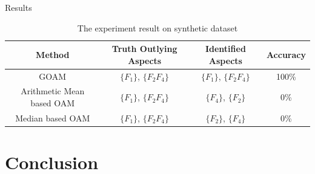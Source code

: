 \documentclass[
 size=14pt,
 paper=smartboard,  %
 mode=present, 		%
 display=slides, 	%
 style=tuliplab,  	%
 pauseslide,
 fleqn,leqno]{powerdot}
\begin{document}
\begin{slide}{Results}

\begin{table}[tb]
\setlength{\abovecaptionskip}{0pt}
\setlength{\belowcaptionskip}{10pt}
\centering
\caption{The experiment result on synthetic dataset}

\begin{tabular}{ c | c | c | c }
\toprule
  Method     &  Truth Outlying Aspects    & Identified Aspects & Accuracy      \\
\midrule
  GOAM       &  $\{F_1\}$, $\{F_2F_4\}$   &  $\{F_1\}$, $\{F_2F_4\}$    & 100\%    \\

Arithmetic Mean based OAM &  $\{F_1\}$, $\{F_2F_4\}$   &  $\{F_4\}$, $\{F_2\}$    &  0\% \\

Median based OAM &  $\{F_1\}$, $\{F_2F_4\}$   &  $\{F_2\}$, $\{F_4\}$    &           0\% \\
\bottomrule
\end{tabular}
\end{table}

\end{slide}


\section{Conclusion}
\end{document}
